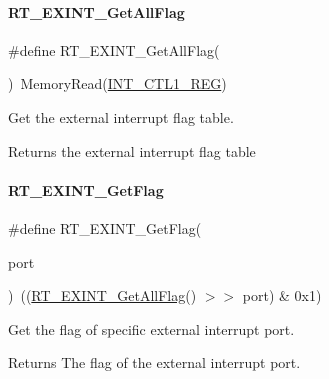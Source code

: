 \paragraph{\texorpdfstring{R\+T\+\_\+\+E\+X\+I\+N\+T\+\_\+\+Get\+All\+Flag}{RT\_EXINT\_GetAllFlag}}
{\footnotesize\ttfamily \#define R\+T\+\_\+\+E\+X\+I\+N\+T\+\_\+\+Get\+All\+Flag(\begin{DoxyParamCaption}{ }\end{DoxyParamCaption})~Memory\+Read(\mbox{\hyperlink{a00020_adadaa0ab1ebbd7ba9b70dfd24c3ed44dabc5f0d33bb47527f3d8a9c20250d5c5b}{I\+N\+T\+\_\+\+C\+T\+L1\+\_\+\+R\+EG}})}



Get the external interrupt flag table. 

\begin{DoxyReturn}{Returns}
the external interrupt flag table 
\end{DoxyReturn}
\mbox{\label{a00011_ae65409aaf69a9f495207ebbe133f161d}} 
\paragraph{\texorpdfstring{R\+T\+\_\+\+E\+X\+I\+N\+T\+\_\+\+Get\+Flag}{RT\_EXINT\_GetFlag}}
{\footnotesize\ttfamily \#define R\+T\+\_\+\+E\+X\+I\+N\+T\+\_\+\+Get\+Flag(\begin{DoxyParamCaption}\item[{}]{port }\end{DoxyParamCaption})~((\mbox{\hyperlink{a00011_ab8287fc872a2d0ae785c8b3b51a37a5e}{R\+T\+\_\+\+E\+X\+I\+N\+T\+\_\+\+Get\+All\+Flag}}() $>$$>$ port) \& 0x1)}



Get the flag of specific external interrupt port. 

\begin{DoxyReturn}{Returns}
The flag of the external interrupt port. 
\end{DoxyReturn}
\mbox{\label{a00011_aa1a62e0954243f0c0fc8ec850ea2eebe}} 
